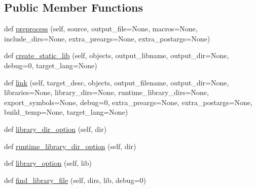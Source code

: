 \subsection*{Public Member Functions}
\begin{DoxyCompactItemize}
\item 
def \hyperlink{classsetuptools_1_1__distutils_1_1unixccompiler_1_1UnixCCompiler_abcad2a3a14b082195203df6cdee75790}{preprocess} (self, source, output\+\_\+file=None, macros=None, include\+\_\+dirs=None, extra\+\_\+preargs=None, extra\+\_\+postargs=None)
\item 
def \hyperlink{classsetuptools_1_1__distutils_1_1unixccompiler_1_1UnixCCompiler_a068ebecbaff8eea8312ae2361a5eacb4}{create\+\_\+static\+\_\+lib} (self, objects, output\+\_\+libname, output\+\_\+dir=None, debug=0, target\+\_\+lang=None)
\item 
def \hyperlink{classsetuptools_1_1__distutils_1_1unixccompiler_1_1UnixCCompiler_ae8948f20395c495400e9dc21692c601a}{link} (self, target\+\_\+desc, objects, output\+\_\+filename, output\+\_\+dir=None, libraries=None, library\+\_\+dirs=None, runtime\+\_\+library\+\_\+dirs=None, export\+\_\+symbols=None, debug=0, extra\+\_\+preargs=None, extra\+\_\+postargs=None, build\+\_\+temp=None, target\+\_\+lang=None)
\item 
def \hyperlink{classsetuptools_1_1__distutils_1_1unixccompiler_1_1UnixCCompiler_af0845574a6b2d2ecd1d8433b29c5e528}{library\+\_\+dir\+\_\+option} (self, dir)
\item 
def \hyperlink{classsetuptools_1_1__distutils_1_1unixccompiler_1_1UnixCCompiler_ae3450bf78f9b1c131bddcb828ce315f9}{runtime\+\_\+library\+\_\+dir\+\_\+option} (self, dir)
\item 
def \hyperlink{classsetuptools_1_1__distutils_1_1unixccompiler_1_1UnixCCompiler_aa1be046f5537d875eebc4ee78bb87cee}{library\+\_\+option} (self, lib)
\item 
def \hyperlink{classsetuptools_1_1__distutils_1_1unixccompiler_1_1UnixCCompiler_a9ca7a0c2aa4ba37b41104f180ed38e74}{find\+\_\+library\+\_\+file} (self, dirs, lib, debug=0)
\end{DoxyCompactItemize}
